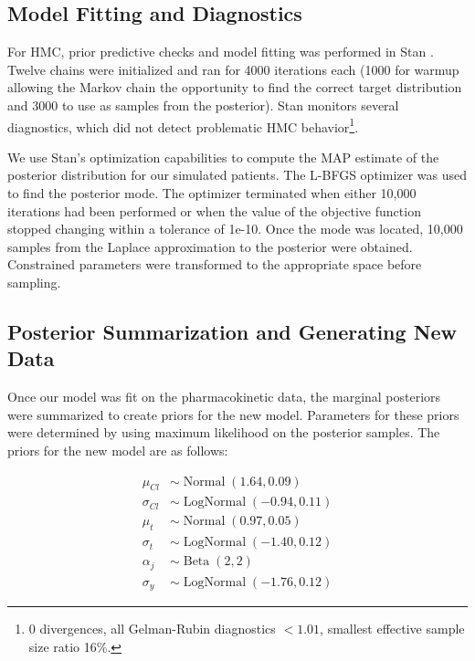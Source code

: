\subsection*{Model Fitting and Diagnostics}

For HMC, prior predictive checks and model fitting was performed in Stan \citep{Carpenter2017-qf}.  Twelve chains were initialized and ran for 4000 iterations each (1000 for warmup allowing the Markov chain the opportunity to find the correct target distribution and 3000 to use as samples from the posterior). Stan monitors several diagnostics, which did not detect problematic HMC behavior\footnote{0 divergences, all Gelman-Rubin diagnostics $<1.01$, smallest effective sample size ratio 16\%.}.

We use Stan’s optimization capabilities to compute the MAP estimate of the posterior distribution for our simulated patients.  The L-BFGS optimizer was used to find the posterior mode.  The optimizer terminated when either 10,000 iterations had been performed or when the value of the objective function stopped changing within a tolerance of 1e-10. Once the mode was located, 10,000 samples from the Laplace approximation to the posterior were obtained. Constrained parameters were transformed to the appropriate space before sampling.

\subsection*{Posterior Summarization and Generating New Data}

Once our model was fit on the pharmacokinetic data, the marginal posteriors were summarized to create priors for the new model.  Parameters for these priors were determined by using maximum likelihood on the posterior samples.  The priors for the new model are as follows:

\begin{align}
	\mu_{Cl} &\sim \operatorname{Normal}(1.64, 0.09)  \label{eq:eq_18} \\
	\sigma_{Cl} &\sim \operatorname{LogNormal}(-0.94, 0.11)  \label{eq:eq_19} \\
	\mu_{t} &\sim \operatorname{Normal}(0.97, 0.05)   \label{eq:eq_20} \\
	\sigma_{t} &\sim \operatorname{LogNormal}(-1.40, 0.12)  \label{eq:eq_21} \\
	\alpha_j &\sim \operatorname{Beta}(2,2)  \label{eq:eq_22} \\
	\sigma_y &\sim \operatorname{LogNormal}(-1.76, 0.12)  \label{eq:eq_23}
\end{align}

